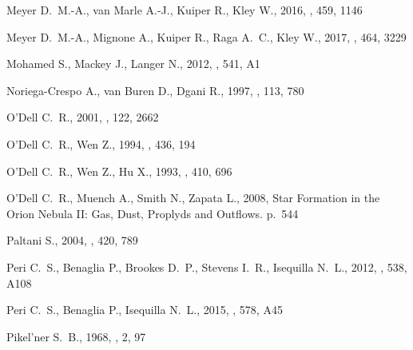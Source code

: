 \documentclass[useAMS, usenatbib, a4paper]{mnras}
\begin{document}
\begin{thebibliography}{}
{Meyer} D.~M.-A.,  {van Marle} A.-J.,  {Kuiper} R.,   {Kley} W.,  2016, \mnras,
  459, 1146

{Meyer} D.~M.-A.,  {Mignone} A.,  {Kuiper} R.,  {Raga} A.~C.,   {Kley} W.,
  2017, \mnras, 464, 3229

{Mohamed} S.,  {Mackey} J.,   {Langer} N.,  2012, \aap, 541, A1

{Noriega-Crespo} A.,  {van Buren} D.,   {Dgani} R.,  1997, \aj, 113, 780

{O'Dell} C.~R.,  2001, \aj, 122, 2662

{O'Dell} C.~R.,  {Wen} Z.,  1994, \apj, 436, 194

{O'Dell} C.~R.,  {Wen} Z.,   {Hu} X.,  1993, \apj, 410, 696

{O'Dell} C.~R.,  {Muench} A.,  {Smith} N.,   {Zapata} L.,  2008, {Star
  Formation in the Orion Nebula II: Gas, Dust, Proplyds and Outflows}.
p.~544

{Paltani} S.,  2004, \aap, 420, 789

{Peri} C.~S.,  {Benaglia} P.,  {Brookes} D.~P.,  {Stevens} I.~R.,   {Isequilla}
  N.~L.,  2012, \aap, 538, A108

{Peri} C.~S.,  {Benaglia} P.,   {Isequilla} N.~L.,  2015, \aap, 578, A45

{Pikel'ner} S.~B.,  1968, \aplett, 2, 97


\end{thebibliography}
\end{document}
